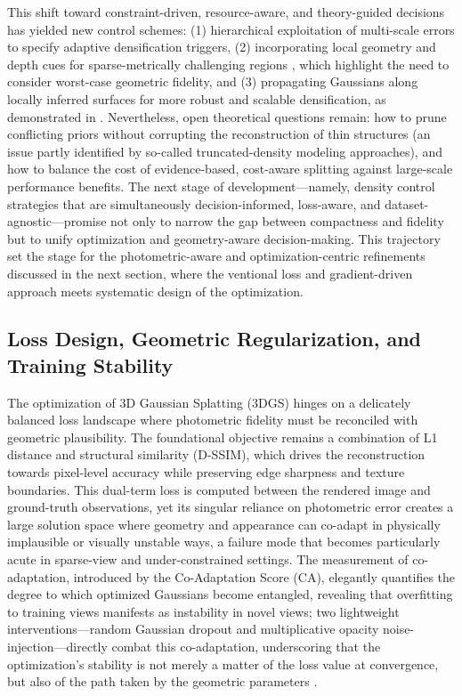 \documentclass[11pt,a4paper]{article}
\begin{document}
This shift toward constraint-driven, resource-aware, and theory-guided decisions has yielded new control schemes: (1) hierarchical exploitation of multi-scale errors to specify adaptive densification triggers, (2) incorporating local geometry and depth cues for sparse-metrically challenging regions \cite{arxiv:2501.11508v1}, which highlight the need to consider worst-case geometric fidelity, and (3) propagating Gaussians along locally inferred surfaces for more robust and scalable densification, as demonstrated in \cite{arxiv:2402.14650v1}. Nevertheless, open theoretical questions remain: how to prune conflicting priors without corrupting the reconstruction of thin structures (an issue partly identified by so-called truncated-density modeling approaches), and how to balance the cost of evidence-based, cost-aware splitting against large-scale performance benefits. The next stage of development---namely, density control strategies that are simultaneously decision-informed, loss-aware, and dataset-agnostic---promise not only to narrow the gap between compactness and fidelity but to unify optimization and geometry-aware decision-making. This trajectory set the stage for the photometric-aware and optimization-centric refinements discussed in the next section, where the ventional loss and gradient-driven approach meets systematic design of the optimization.


\subsection{Loss Design, Geometric Regularization, and Training Stability}


The optimization of 3D Gaussian Splatting (3DGS) hinges on a delicately balanced loss landscape where photometric fidelity must be reconciled with geometric plausibility. The foundational objective remains a combination of L1 distance and structural similarity (D-SSIM), which drives the reconstruction towards pixel-level accuracy while preserving edge sharpness and texture boundaries. This dual-term loss is computed between the rendered image and ground-truth observations, yet its singular reliance on photometric error creates a large solution space where geometry and appearance can co-adapt in physically implausible or visually unstable ways, a failure mode that becomes particularly acute in sparse-view and under-constrained settings. The measurement of co-adaptation, introduced by the Co-Adaptation Score (CA), elegantly quantifies the degree to which optimized Gaussians become entangled, revealing that overfitting to training views manifests as instability in novel views; two lightweight interventions---random Gaussian dropout and multiplicative opacity noise-injection---directly combat this co-adaptation, underscoring that the optimization's stability is not merely a matter of the loss value at convergence, but also of the path taken by the geometric parameters \cite{arxiv:2508.12720v3,arxiv:2402.00525v1}.
\end{document}

